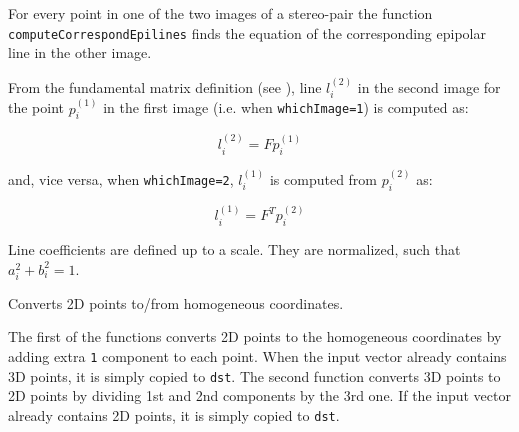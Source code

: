 \begin{description}
\end{description}

For every point in one of the two images of a stereo-pair the function
\texttt{computeCorrespondEpilines} finds the equation of the
corresponding epipolar line in the other image.

From the fundamental matrix definition (see ),
line $l^{(2)}_i$ in the second image for the point $p^{(1)}_i$ in the first image (i.e. when \texttt{whichImage=1}) is computed as:

\[ l^{(2)}_i = F p^{(1)}_i \]

and, vice versa, when \texttt{whichImage=2}, $l^{(1)}_i$ is computed from $p^{(2)}_i$ as:

\[ l^{(1)}_i = F^T p^{(2)}_i \]

Line coefficients are defined up to a scale. They are normalized, such that $a_i^2+b_i^2=1$.

Converts 2D points to/from homogeneous coordinates.


\begin{description}
\end{description}

The first of the functions converts 2D points to the homogeneous coordinates by adding extra \texttt{1} component to each point. When the input vector already contains 3D points, it is simply copied to \texttt{dst}. The second function converts 3D points to 2D points by dividing 1st and 2nd components by the 3rd one. If the input vector already contains 2D points, it is simply copied to \texttt{dst}.

